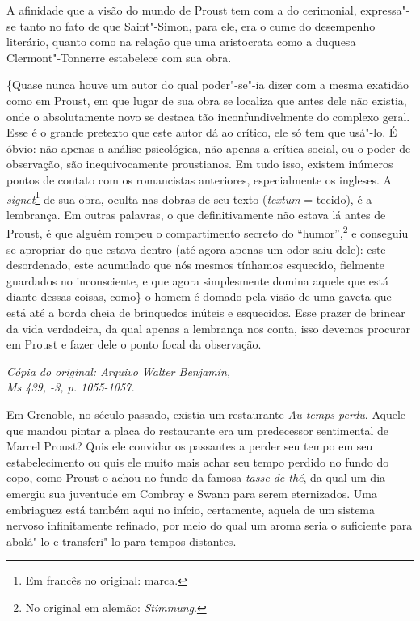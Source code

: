 A afinidade que a visão do mundo de Proust tem com a do cerimonial,
expressa"-se tanto no fato de que Saint"-Simon, para ele, era o cume do
desempenho literário, quanto como na relação que uma aristocrata como a
duquesa Clermont"-Tonnerre estabelece com sua obra.

\{Quase nunca houve um autor do qual poder"-se"-ia dizer com a mesma exatidão
como em Proust, em que lugar de sua obra se localiza que antes dele não
existia, onde o absolutamente novo se destaca tão inconfundivelmente do
complexo geral. Esse é o grande pretexto que este autor dá ao crítico,
ele só tem que usá"-lo. É óbvio: não apenas a análise psicológica, não apenas a crítica
social, ou o poder de observação, são inequivocamente proustianos. Em
tudo isso, existem inúmeros pontos de contato com os romancistas
anteriores, especialmente os ingleses. A \emph{signet}\footnote{Em francês no original: marca. \versal{[N. T.]}} de sua obra, oculta nas dobras de
seu texto (\emph{textum} = tecido), é a lembrança. Em outras palavras, o
que definitivamente não estava lá antes de Proust, é que alguém rompeu o
compartimento secreto do ``humor'',\footnote{No original em alemão:
  \emph{Stimmung}. \versal{[N. T.]}} e conseguiu se apropriar do que estava dentro (até
agora apenas um odor saiu dele): este desordenado, este acumulado que
nós mesmos tínhamos esquecido, fielmente guardados no inconsciente, e
que agora simplesmente domina aquele que está diante dessas coisas,
como\} o homem é domado pela visão de uma gaveta que está até a borda
cheia de brinquedos inúteis e esquecidos. Esse prazer de brincar da vida
verdadeira, da qual apenas a lembrança nos conta, isso devemos procurar
em Proust e fazer dele o ponto focal da observação.


\begin{flushright}
\emph{\footnotesize{Cópia do original: Arquivo Walter Benjamin,\\ Ms 439, -3, p. 1055-1057.}}
\end{flushright}

Em Grenoble, no século passado, existia um restaurante \emph{Au temps
perdu}. Aquele que mandou pintar a placa do restaurante era um
predecessor sentimental de Marcel Proust? Quis ele convidar os passantes
a perder seu tempo em seu estabelecimento ou quis ele muito mais achar
seu tempo perdido no fundo do copo, como Proust o achou no fundo da
famosa \emph{tasse de thé}, da qual um dia emergiu sua juventude em
Combray e Swann para serem eternizados. Uma embriaguez está também aqui
no início, certamente, aquela de um sistema nervoso infinitamente
refinado, por meio do qual um aroma seria o suficiente para abalá"-lo e
transferi"-lo para tempos distantes.

